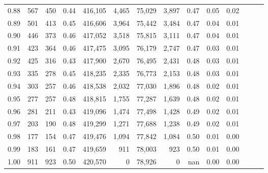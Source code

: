 \begin{tabular}{rrrrrrrrrrrrrr}
0.88 &     567 &    450 &  0.44 &  416,105 &    4,465 &  75,029 &   3,897 &  0.47 &  0.05 &      0.02 \\
0.89 &     501 &    413 &  0.45 &  416,606 &    3,964 &  75,442 &   3,484 &  0.47 &  0.04 &      0.01 \\
0.90 &     446 &    373 &  0.46 &  417,052 &    3,518 &  75,815 &   3,111 &  0.47 &  0.04 &      0.01 \\
0.91 &     423 &    364 &  0.46 &  417,475 &    3,095 &  76,179 &   2,747 &  0.47 &  0.03 &      0.01 \\
0.92 &     425 &    316 &  0.43 &  417,900 &    2,670 &  76,495 &   2,431 &  0.48 &  0.03 &      0.01 \\
0.93 &     335 &    278 &  0.45 &  418,235 &    2,335 &  76,773 &   2,153 &  0.48 &  0.03 &      0.01 \\
0.94 &     303 &    257 &  0.46 &  418,538 &    2,032 &  77,030 &   1,896 &  0.48 &  0.02 &      0.01 \\
0.95 &     277 &    257 &  0.48 &  418,815 &    1,755 &  77,287 &   1,639 &  0.48 &  0.02 &      0.01 \\
0.96 &     281 &    211 &  0.43 &  419,096 &    1,474 &  77,498 &   1,428 &  0.49 &  0.02 &      0.01 \\
0.97 &     203 &    190 &  0.48 &  419,299 &    1,271 &  77,688 &   1,238 &  0.49 &  0.02 &      0.01 \\
0.98 &     177 &    154 &  0.47 &  419,476 &    1,094 &  77,842 &   1,084 &  0.50 &  0.01 &      0.00 \\
0.99 &     183 &    161 &  0.47 &  419,659 &      911 &  78,003 &     923 &  0.50 &  0.01 &      0.00 \\
1.00 &     911 &    923 &  0.50 &  420,570 &        0 &  78,926 &       0 &   nan &  0.00 &      0.00 \\
\bottomrule
\end{tabular}
